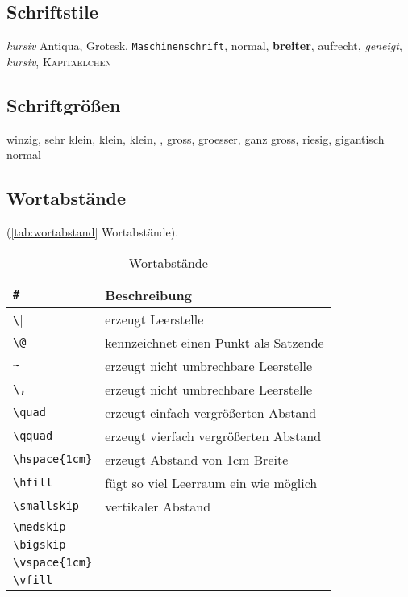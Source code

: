 \subsection{Schriftstile}\label{sec:schriftstile}

\emph{kursiv}
\textrm{Antiqua}, \textsf{Grotesk}, \texttt{Maschinenschrift},
\textmd{normal}, \textbf{breiter}, \textup{aufrecht}, \textsl{geneigt},
\textit{kursiv}, \textsc{Kapitaelchen}

\subsection{Schriftgrößen}

\tiny{winzig}, \scriptsize{sehr klein}, \footnotesize{klein},
\small{klein}, , \large{gross}, \Large{groesser},
\LARGE{ganz gross}, \huge{riesig}, \Huge{gigantisch} \normalsize{normal}

\subsection{Wortabstände}\label{sec:Wortabstaende}

(\autoref{tab:wortabstand} Wortabstände).
\begin{table}[!hb] %
	\centering
	\begin{tabular} {ll}
	\toprule %
	\verb|#| & \textbf{Beschreibung} \\
	\midrule
			\verb|\| & erzeugt Leerstelle \\
			\verb|\@| & kennzeichnet einen Punkt als Satzende \\
			\verb|~| & erzeugt nicht umbrechbare Leerstelle \\
			\verb|\,| & erzeugt nicht umbrechbare Leerstelle \\
			\verb|\quad| & erzeugt einfach vergrößerten Abstand \\
			\verb|\qquad| & erzeugt vierfach vergrößerten Abstand \\
			\verb|\hspace{1cm}| & erzeugt Abstand von 1cm Breite \\
			\verb|\hfill| & fügt so viel Leerraum ein wie möglich \\
			\verb|\smallskip| & vertikaler Abstand\\
			\verb|\medskip| & \\
			\verb|\bigskip| & \\
			\verb|\vspace{1cm}| & \\
			\verb|\vfill| & \\
	\bottomrule
	\end{tabular}
	\caption{Wortabstände }	%
	\label{tab:wortabstand}	%
\end{table}

